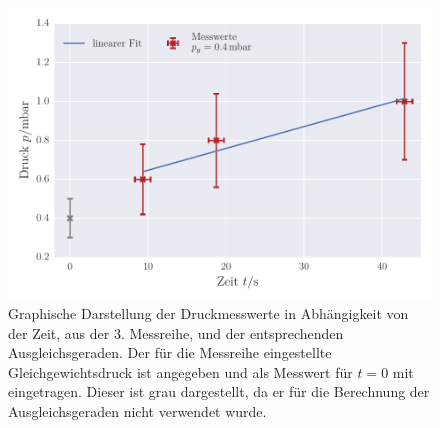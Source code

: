 \begin{figure}[!h]
 \centering
 \includegraphics[scale=0.8]{../Grafiken/Leckrate_Drehschieber_2.pdf}
 \caption{Graphische Darstellung der Druckmesswerte in Abhängigkeit von der Zeit, aus der 3. Messreihe, und der
 	entsprechenden Ausgleichsgeraden. Der für die Messreihe eingestellte Gleichgewichtsdruck ist angegeben und als Messwert für $t=0$ mit eingetragen. Dieser ist grau dargestellt, da er für die 
 	Berechnung der Ausgleichsgeraden nicht verwendet wurde. \label{fig:leckrate_drehschieber_2}}
 \end{figure} 